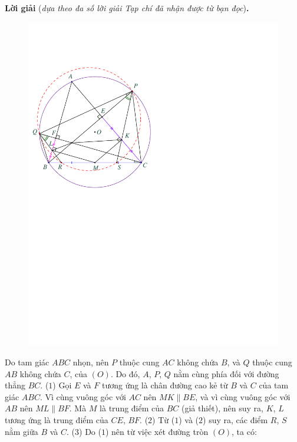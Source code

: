 \begin{multicols}{2}
	\vskip 0.05cm
	\textbf{\color{thachthuctoanhoc}Lời giải} (\textit{dựa theo đa số lời giải Tạp chí đã nhận được từ bạn đọc})\textbf{\color{thachthuctoanhoc}.}
	\begin{figure}[H]
		\centering
		\vspace*{-5pt}
		\captionsetup{labelformat= empty, justification=centering}
		\includegraphics[width=0.85\linewidth]{P624}
		\vspace*{-10pt}
	\end{figure}
	Do tam giác $ABC$ nhọn, nên $P$ thuộc cung $AC$ không chứa $B$, và $Q$ thuộc cung $AB$ không chứa $C$, của $(O)$. Do đó, $A$, $P$, $Q$ nằm cùng phía đối với đường thẳng $BC$. \hfill ($1$)
	\vskip 0.05cm
	Gọi $E$ và $F$ tương ứng là chân đường cao kẻ từ $B$ và $C$ của tam giác $ABC$.
	\vskip 0.05cm
	Vì cùng vuông góc với $AC$ nên $MK \parallel BE$, và vì cùng vuông góc với $AB$ nên $ML \parallel BF$. Mà $M$ là trung điểm của $BC$ (giả thiết), nên suy ra, $K$, $L$ tương ứng là trung điểm của \linebreak$CE$, $BF$. \hfill ($2$)
	\vskip 0.05cm
	Từ ($1$) và ($2$) suy ra, các điểm $R$, $S$ nằm giữa $B$ và $C$. \hfill ($3$)
	\vskip 0.05cm
	Do ($1$) nên từ việc xét đường tròn $(O)$, ta có:
	\begin{align*}

\end{align*}
\end{multicols}
